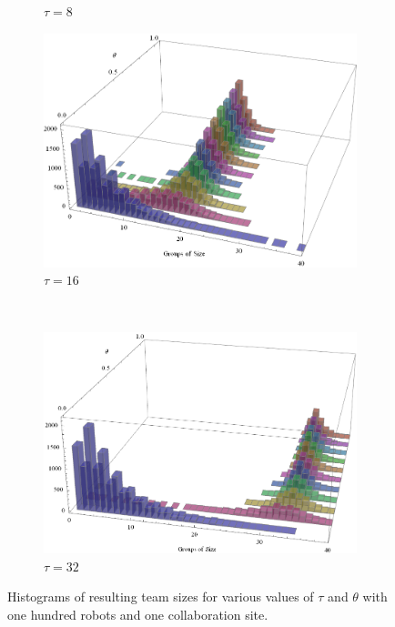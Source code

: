 \documentclass[11pt, onecolumn, compsoc, letterpaper]{article}
\begin{document}
\begin{figure}[!htb]
\begin{subfigure}{0.5\textwidth}
\centering\caption{$\tau = 8$}\label{fig:collabsweep8}
\end{subfigure}
\begin{subfigure}{0.5\textwidth}
\centering\includegraphics[width=1.0\textwidth]{../assets/collabratesweep16.png}
\centering\caption{$\tau = 16$}\label{fig:collabsweep16}
\end{subfigure}~
\begin{subfigure}{0.5\textwidth}
\centering\includegraphics[width=1.0\textwidth]{../assets/collabratesweep32.png}
\centering\caption{$\tau = 32$}\label{fig:collabsweep32}
\end{subfigure}
\caption{Histograms of resulting team sizes for various values of $\tau$ and $\theta$ with one hundred robots and one collaboration site.}\label{fig:collabsweep}
\end{figure}
\end{document}
